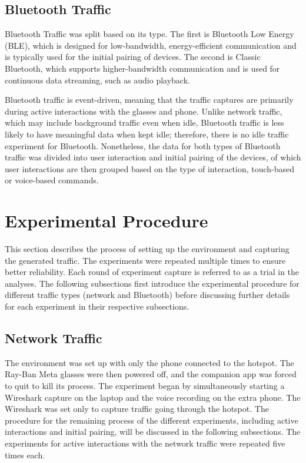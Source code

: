 \subsection*{Bluetooth Traffic}
Bluetooth Traffic was split based on its type. The first is Bluetooth Low Energy (BLE), which is designed for low-bandwidth, energy-efficient communication and is typically used for the initial pairing of devices. The second is Classic Bluetooth, which supports higher-bandwidth communication and is used for continuous data streaming, such as audio playback. 

Bluetooth traffic is event-driven, meaning that the traffic captures are primarily during active interactions with the glasses and phone. Unlike network traffic, which may include background traffic even when idle, Bluetooth traffic is less likely to have meaningful data when kept idle; therefore, there is no idle traffic experiment for Bluetooth. Nonetheless, the data for both types of Bluetooth traffic was divided into user interaction and initial pairing of the devices, of which user interactions are then grouped based on the type of interaction, touch-based or voice-based commands.


\section{Experimental Procedure}
This section describes the process of setting up the environment and capturing the generated traffic. The experiments were repeated multiple times to ensure better reliability. Each round of experiment capture is referred to as a trial in the analyses. The following subsections first introduce the experimental procedure for different traffic types (network and Bluetooth) before discussing further details for each experiment in their respective subsections. 

\subsection*{Network Traffic}
The environment was set up with only the phone connected to the hotspot. The Ray-Ban Meta glasses were then powered off, and the companion app was forced to quit to kill its process. The experiment began by simultaneously starting a Wireshark capture on the laptop and the voice recording on the extra phone. The Wireshark was set only to capture traffic going through the hotspot. The procedure for the remaining process of the different experiments, including active interactions and initial pairing, will be discussed in the following subsections. The experiments for active interactions with the network traffic were repeated five times each.

